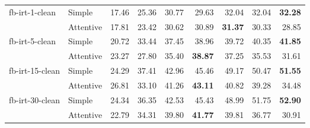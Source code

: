 \begin{tabular}{| l | l | r | r | r | r | r | r | r |}
    \multirow{2}{*}{fb-irt-1-clean}
    & Simple    & 17.46 & 25.36 & 30.77 & 29.63 & 32.04 & 32.04 & \textbf{32.28} \\
    & Attentive & 17.81 & 23.42 & 30.62 & 30.89 & \textbf{31.37} & 30.33 & 28.85 \\ \hline

    \multirow{2}{*}{fb-irt-5-clean}
    & Simple    & 20.72 & 33.44 & 37.45 & 38.96 & 39.72 & 40.35 & \textbf{41.85} \\
    & Attentive & 23.27 & 27.80 & 35.40 & \textbf{38.87} & 37.25 & 35.53 & 31.61 \\ \hline

    \multirow{2}{*}{fb-irt-15-clean}
    & Simple    & 24.29 & 37.41 & 42.96 & 45.46 & 49.17 & 50.47 & \textbf{51.55} \\
    & Attentive & 26.81 & 33.10 & 41.26 & \textbf{43.11} & 40.82 & 39.28 & 34.48 \\ \hline

    \multirow{2}{*}{fb-irt-30-clean}
    & Simple    & 24.34 & 36.35 & 42.53 & 45.43 & 48.99 & 51.75 & \textbf{52.90} \\
    & Attentive & 22.79 & 34.31 & 39.80 & \textbf{41.77} & 39.81 & 36.77 & 30.91 \\ \hline

\end{tabular}
